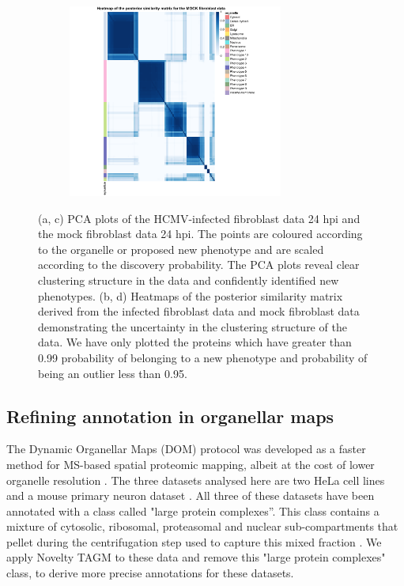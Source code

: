 \documentclass[12pt,english]{article}
\begin{document}
\begin{figure}
\begin{subfigure}[t]{0.5\textwidth}
	\centering
	\includegraphics[height=2.5in]{heatmapMOCK.pdf}
	\caption{}
\end{subfigure}
\caption{(a, c) PCA plots of the HCMV-infected fibroblast data 24 hpi and the mock fibroblast data 24 hpi. The points are coloured according to the organelle or proposed new phenotype and are scaled according to the discovery probability. The PCA plots reveal clear clustering structure in the data and confidently identified new phenotypes. (b, d) Heatmaps of the posterior similarity matrix derived from the infected fibroblast data and mock fibroblast data demonstrating the uncertainty in the clustering structure of the data. We have only plotted the proteins which have greater than 0.99 probability of belonging to a new phenotype and probability of being an outlier less than 0.95.}
 \label{figure:Beltran}
\end{figure}
\clearpage
\subsection{Refining annotation in organellar maps}
The Dynamic Organellar Maps (DOM) protocol was developed as a faster method for MS-based spatial proteomic mapping, albeit at the cost of lower organelle resolution \citep{Itzhak:2016,Gatto:2018}. The three datasets analysed here are two HeLa cell lines \citep{Itzhak:2016, Hirst:2018} and a mouse primary neuron dataset \citep{Itzhak::2017}. All three of these datasets have been annotated with a class called "large protein complexes''. This class contains a mixture of cytosolic, ribosomal, proteasomal and nuclear sub-compartments that pellet during the centrifugation step used to capture this mixed fraction \citep{Itzhak:2016}. We apply Novelty TAGM to these data and remove this "large protein complexes" class, to derive more precise annotations for these datasets. 
\end{document}
